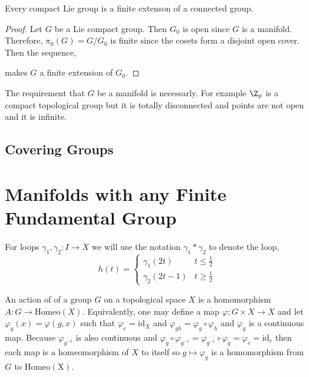 \documentclass[12pt]{extarticle}
\begin{document}
\begin{proposition}
Every compact Lie group is a finite extenson of a connected group. 
\end{proposition}

\begin{proof}
Let $G$ be a Lie compact group. Then $G_0$ is open since $G$ is a manifold. Therefore, $\pi_0(G) = G / G_0$ is finite since the cosets form a disjoint open cover. Then the sequence,
\begin{center}
\end{center}
makes $G$ a finite extension of $G_0$. 
\end{proof}

\begin{remark}
The requirement that $G$ be a manifold is necessarly. For example $\Z_p$ is a compact topological group but it is totally disconnected and points are not open and it is infinite. 
\end{remark}

\subsection{Covering Groups}


\section{Manifolds with any Finite Fundamental Group}

\begin{remark}
For loops $\gamma_1, \gamma_2 : I \to X$ we will use the notation $\gamma_1 * \gamma_2$ to denote the loop, \[h(t) = \begin{cases} \gamma_1(2t) & t \le \frac{1}{2} \\ \gamma_2(2t - 1) & t \ge \frac{1}{2} \end{cases}\]
\end{remark}

\begin{definition}
An action of of a group $G$ on a topological space $X$ is a homomorphism $A : G \to \mathrm{Homeo}(X)$. Equivalently, one may define a map $\varphi : G \times X \to X$ and let $\varphi_g(x) = \varphi(g, x)$ such that $\varphi_e = \mathrm{id}_X$ and $\varphi_{gh} = \varphi_g \circ \varphi_h$ and $\varphi_g$ is a continuous map. Because $\varphi_{g^{-1}}$ is also continuous and $\varphi_g \circ \varphi_{g^{-1}} = \varphi_{g^{-1}} \circ \varphi_{g} = \varphi_e = \mathrm{id}_e$ then each map is a homeomorphism of $X$ to itself so $g \mapsto \varphi_g$ is a homomorphism from $G$ to $\mathrm{Homeo(X)}$.  
\end{definition}
\end{document}
